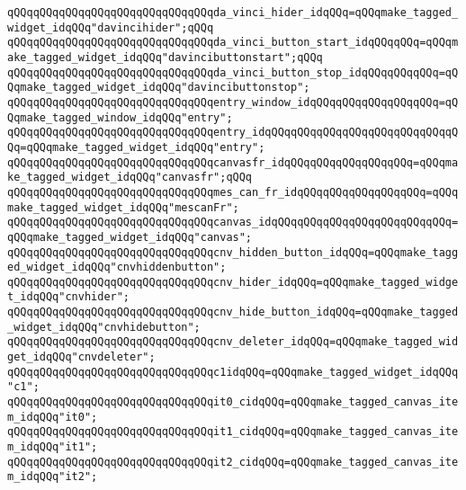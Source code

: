 \verb|qQQqqQQqqQQqqQQqqQQqqQQqqQQqqQQqda_vinci_hider_idqQQq=qQQqmake_tagged_widget_idqQQq"davincihider";qQQq|\newline
\verb|qQQqqQQqqQQqqQQqqQQqqQQqqQQqqQQqda_vinci_button_start_idqQQqqQQq=qQQqmake_tagged_widget_idqQQq"davincibuttonstart";qQQq|\newline
\verb|qQQqqQQqqQQqqQQqqQQqqQQqqQQqqQQqda_vinci_button_stop_idqQQqqQQqqQQq=qQQqmake_tagged_widget_idqQQq"davincibuttonstop";|\newline
\verb|qQQqqQQqqQQqqQQqqQQqqQQqqQQqqQQqentry_window_idqQQqqQQqqQQqqQQqqQQq=qQQqmake_tagged_window_idqQQq"entry";|\newline
\verb|qQQqqQQqqQQqqQQqqQQqqQQqqQQqqQQqentry_idqQQqqQQqqQQqqQQqqQQqqQQqqQQqqQQq=qQQqmake_tagged_widget_idqQQq"entry";|\newline
\verb|qQQqqQQqqQQqqQQqqQQqqQQqqQQqqQQqcanvasfr_idqQQqqQQqqQQqqQQqqQQq=qQQqmake_tagged_widget_idqQQq"canvasfr";qQQq|\newline
\verb|qQQqqQQqqQQqqQQqqQQqqQQqqQQqqQQqmes_can_fr_idqQQqqQQqqQQqqQQqqQQq=qQQqmake_tagged_widget_idqQQq"mescanFr";|\newline
\verb|qQQqqQQqqQQqqQQqqQQqqQQqqQQqqQQqcanvas_idqQQqqQQqqQQqqQQqqQQqqQQqqQQq=qQQqmake_tagged_widget_idqQQq"canvas";|\newline
\newline
\verb|qQQqqQQqqQQqqQQqqQQqqQQqqQQqqQQqcnv_hidden_button_idqQQq=qQQqmake_tagged_widget_idqQQq"cnvhiddenbutton";|\newline
\verb|qQQqqQQqqQQqqQQqqQQqqQQqqQQqqQQqcnv_hider_idqQQq=qQQqmake_tagged_widget_idqQQq"cnvhider";|\newline
\verb|qQQqqQQqqQQqqQQqqQQqqQQqqQQqqQQqcnv_hide_button_idqQQq=qQQqmake_tagged_widget_idqQQq"cnvhidebutton";|\newline
\verb|qQQqqQQqqQQqqQQqqQQqqQQqqQQqqQQqcnv_deleter_idqQQq=qQQqmake_tagged_widget_idqQQq"cnvdeleter";|\newline
\newline
\verb|qQQqqQQqqQQqqQQqqQQqqQQqqQQqqQQqc1idqQQq=qQQqmake_tagged_widget_idqQQq"c1";|\newline
\newline
\verb|qQQqqQQqqQQqqQQqqQQqqQQqqQQqqQQqit0_cidqQQq=qQQqmake_tagged_canvas_item_idqQQq"it0";|\newline
\verb|qQQqqQQqqQQqqQQqqQQqqQQqqQQqqQQqit1_cidqQQq=qQQqmake_tagged_canvas_item_idqQQq"it1";|\newline
\verb|qQQqqQQqqQQqqQQqqQQqqQQqqQQqqQQqit2_cidqQQq=qQQqmake_tagged_canvas_item_idqQQq"it2";|\newline

